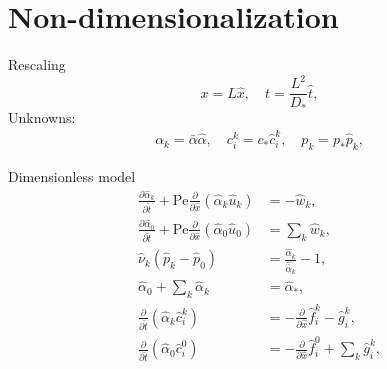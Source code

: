 \documentclass{beamer}
\begin{document}

\section{Non-dimensionalization}
\begin{frame}{Rescaling}
    \begin{equation}
        x = L\hat{x},\quad t = \frac{L^2}{D_*}\hat{t},
    \end{equation}
    Unknowns:
    \begin{gather}
        \alpha_k = \bar{\alpha}\hat{\alpha},\quad c_i^k = c_*\hat{c}_i^k,\quad p_k = p_*\hat{p}_k,
    \end{gather}    
\end{frame}

\begin{frame}{Dimensionless model}
    \begin{align}
        \frac{\partial \hat{\alpha}_k}{\partial \hat{t}}  + \mathrm{Pe}\frac{\partial}{\partial \hat{x}}\left( \hat{\alpha}_k \hat{u}_k \right) &= - \hat{w}_k,\\ \label{eq:nd_1steq}
        \frac{\partial\hat{\alpha}_0}{\partial \hat{t}}+\mathrm{Pe}\frac{\partial}{\partial \hat{x}}\left( \hat{\alpha}_0 \hat{u}_0 \right) &=\sum_k \hat{w}_k,\\
        \hat{\nu}_k\left( \hat{p}_k - \hat{p}_0 \right) &= \frac{\hat{\alpha}_k}{\hat{\bar{\alpha}}_k}-1,\\
        \hat{\alpha}_0 + \sum_{k} \hat{\alpha}_k &= \hat{\alpha}_*,\\
        \frac{\partial}{\partial \hat{t}}\left( \hat{\alpha}_k \hat{c}_i^k \right)&=-\frac{\partial}{\partial \hat{x}} \hat{f}_i^k - \hat{g}_i^k,\\
        \frac{\partial}{\partial \hat{t}}\left( \hat{\alpha}_0 \hat{c}_i^0 \right)&=-\frac{\partial}{\partial \hat{x}} \hat{f}_i^0 + \sum_k \hat{g}_i^k,
    \end{align}
\end{frame}
\end{document}
